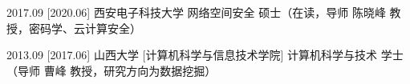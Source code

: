 \documentclass[zh]{resume}
\begin{document}
\begin{myeducations}
  \myeducation
    {2017.09}
    [2020.06]
    {西安电子科技大学}
    {网络空间安全}%
    {硕士（在读，导师 陈晓峰 教授，密码学、云计算安全）}%

  \separator{0.2em}
  \myeducation
    {2013.09}
    [2017.06]
    {山西大学}
    [计算机科学与信息技术学院]
    {计算机科学与技术}%
    {学士（导师 曹峰 教授，研究方向为数据挖掘）}%
\end{myeducations}

\end{document}
